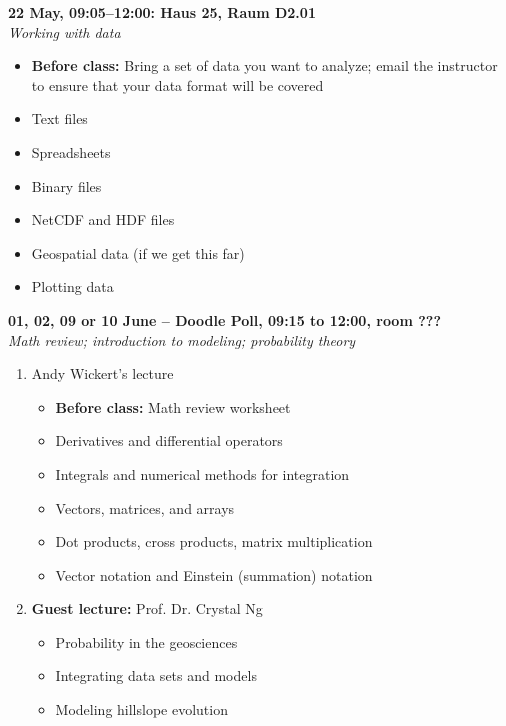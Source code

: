\documentclass[10pt,a4paper]{amsart}
\begin{document}
\begin{minipage}{\linewidth}
\noindent \textbf{22 May, 09:05--12:00: Haus 25, Raum D2.01}\\
\textit{Working with data}
\begin{itemize}
 \item \textbf{Before class:} Bring a set of data you want to analyze; email the instructor to ensure that your data format will be covered
 \item Text files
 \item Spreadsheets
 \item Binary files
 \item NetCDF and HDF files
 \item Geospatial data (if we get this far)
 \item Plotting data
\end{itemize}
\vspace{12pt}
\end{minipage}

\begin{minipage}{\linewidth}
\noindent \textbf{01, 02, 09 or 10 June -- Doodle Poll, 09:15 to 12:00, room ???}\\
\textit{Math review; introduction to modeling; probability theory}
\begin{enumerate}
\item Andy Wickert's lecture
\begin{itemize}
 \item \textbf{Before class:} Math review worksheet
 \item Derivatives and differential operators
 \item Integrals and numerical methods for integration
 \item Vectors, matrices, and arrays
 \item Dot products, cross products, matrix multiplication
 \item Vector notation and Einstein (summation) notation
\end{itemize}
\item \textbf{Guest lecture:} Prof. Dr. Crystal Ng
\begin{itemize}
 \item Probability in the geosciences
 \item Integrating data sets and models
 \item Modeling hillslope evolution
\end{itemize}
\end{enumerate}
\vspace{12pt}
\end{minipage}
\end{document}
